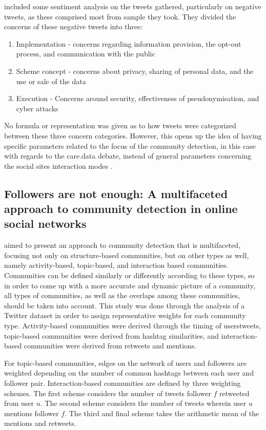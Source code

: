 included some sentiment analysis on the tweets gathered, particularly on negative tweets, as these comprised most from sample they took. They divided the concerns of these negative tweets into three:


\begin{enumerate}
	\item Implementation - concerns regarding information provision, the opt-out process, and communication with the public
	\item Scheme concept - concerns about privacy, sharing of personal data, and the use or sale of the data
	\item Execution - Concerns around security, effectiveness of pseudonymisation, and cyber attacks
	
\end{enumerate}


No formula or representation was given as to how tweets were categorized between these three concern categories. However, this opens up the idea of having specific parameters related to the focus of the community detection, in this case with regards to the care.data debate, instead of general parameters concerning the social site\vtick s interaction modes \cite{Amor:2015}.


\subsection{Followers are not enough: A multifaceted approach to community detection in online social networks}


 aimed to present an approach to community detection that is multifaceted, focusing not only on structure-based communities, but on other types as well, namely activity-based, topic-based, and interaction based communities. Communities can be defined similarly or differently according to these types, so in order to come up with a more accurate and dynamic picture of a community, all types of communities, as well as the overlaps among these communities, should be taken into account. This study was done through the analysis of a Twitter dataset in order to assign representative weights for each community type. Activity-based communities were derived through the timing of users\vtick tweets, topic-based communities were derived from hashtag similarities, and interaction-based communities were derived from retweets and mentions. 


For topic-based communities, edges on the network of users and followers are weighted depending on the number of common hashtags between each user and follower pair. Interaction-based communities are defined by three weighting schemes. The first scheme considers the number of tweets follower $f$ retweeted from user $u$. The second scheme considers the number of tweets wherein user $u$ mentions follower $f$. The third and final scheme takes the arithmetic mean of the mentions and retweets.


